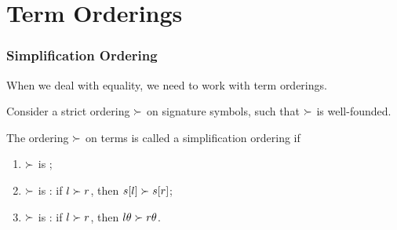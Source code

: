 
\section{Term Orderings}

\begin{frame}
\frametitle{Simplification Ordering}


When we deal with equality, we need to work with \alert{term
  orderings}. 

Consider a strict ordering ${\succ}$ on signature symbols, such that
${\succ}$ is well-founded. 



The ordering ${\succ}$ on terms is called a \alert{simplification ordering}
if

\begin{enumerate}
\item ${\succ}$ is ;
\item ${\succ}$ is : 
if ${l \succ r}$, then ${s[l] \succ s[r]}$;
\item ${\succ}$ is : 
if ${l \succ r}$, then ${l\theta \succ r\theta}$.
\end{enumerate}

                                \end{frame}


